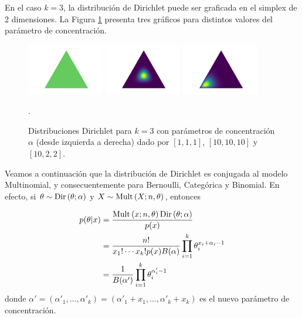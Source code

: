 En el caso $k=3$, la distribución de Dirichlet puede ser graficada en el simplex de 2 dimensiones. La Figura \ref{fig:dist_Dirichlet} presenta tres gráficos para distintos valores del parámetro de concentración. 

\begin{figure}[H]
\includegraphics[width=0.3\textwidth]{img/dirichlet111.png}
\includegraphics[width=0.3\textwidth]{img/dirichlet101010.png}
\includegraphics[width=0.3\textwidth]{img/dirichlet1022.png}
\caption{Distribuciones Dirichlet para $k=3$ con parámetros de concentración $\alpha$ (desde izquierda a derecha) dado por $[1,1,1]$, $[10,10,10]$ y $[10,2,2]$. }.
\label{fig:dist_Dirichlet}
\centering
\end{figure}


Veamos a continuación que la distribución de Dirichlet es conjugada al modelo Multinomial, y consecuentemente para Bernoulli, Categórica y Binomial. En efecto, si $\theta \sim \text{Dir}\left(\theta;\alpha\right)$ y $X\sim\text{Mult}\left(X;n,\theta\right)$, entonces

\begin{align}
	p(\theta|x) &= \frac{\text{Mult}\left(x;n,\theta\right)\text{Dir}\left(\theta;\alpha\right)}{p(x)}\nonumber\\
				&=  \frac{n!}{ x_1!\cdots x_k!p(x) B(\alpha)} \prod_{i=1}^k \theta_i^{x_i + \alpha_i-1}\nonumber\\
				&=  \frac{1}{B(\alpha')} \prod_{i=1}^k \theta_i^{\alpha'_i-1}
				\label{eq:dirichlet_post}
\end{align}
donde $\alpha' = (\alpha'_1,\ldots,\alpha'_k) = (\alpha'_1 + x_1,\ldots,\alpha'_k+ x_k)$ es el nuevo parámetro de concentración.

